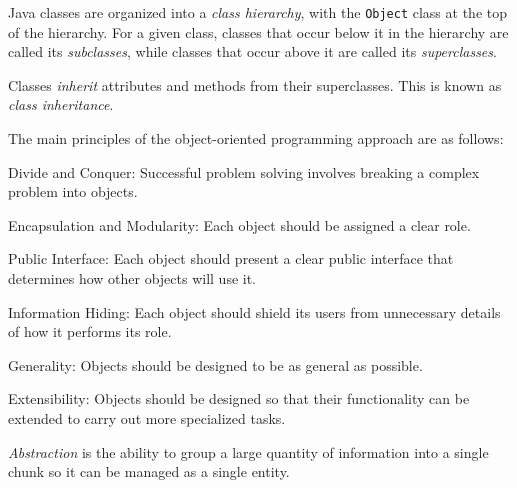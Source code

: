 \begin{SMBL}
\item Java classes are organized into a {\em class hierarchy}, with the
{\tt Object} class at the top of the hierarchy. For a given class, classes
that occur below it in the hierarchy are called its {\em subclasses},
while classes that occur above it are called its {\em superclasses}.

\item Classes {\em inherit} attributes and methods from their superclasses.
This is known as {\em class inheritance}.

\item The main principles of the object-oriented programming approach
are as follows:

\begin{SMBSE}
\item Divide and Conquer: Successful problem solving involves breaking
a complex problem into objects.

\item Encapsulation and Modularity: Each object should be assigned a
clear role.

\item Public Interface: Each object should present a clear public
interface that determines how other objects will use it.

\item Information Hiding: Each object should shield its users from
unnecessary details of how it performs its role.

\item Generality: Objects should be designed to be as general as
possible.

\item Extensibility: Objects should be designed so that their
functionality can be extended to carry out more specialized tasks.

\item {\it Abstraction} is the ability to group a large quantity of
information into a single chunk so it can be managed as a single
entity.  

\end{SMBSE}
\end{SMBL}

